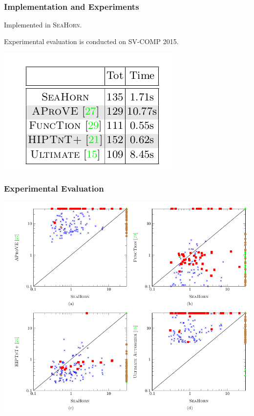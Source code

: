 \documentclass[11pt]{beamer}
\begin{document}
\begin{frame}\frametitle{Implementation and Experiments}

Implemented in \textsc{SeaHorn}. 

Experimental evaluation is conducted on SV-COMP 2015. 

\begin{center}
\includegraphics[scale=0.4]{gen.png}
\end{center}

\end{frame}

\begin{frame}\frametitle{Experimental Evaluation}

\begin{center}
\includegraphics[scale=0.34]{experi.png}
\end{center}
\end{frame}
\end{document}
